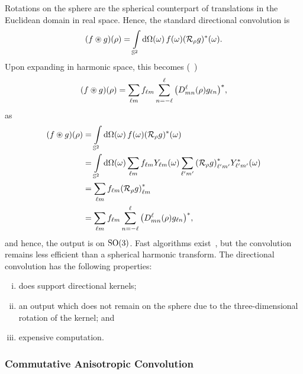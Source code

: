 Rotations on the sphere are the spherical counterpart of translations in the Euclidean domain in real space.
Hence, the standard directional convolution is
%
\begin{equation}\label{eq:chapter3_directional_convolution}
	(f \circledast g)(\rho)
	= \integrateSphere{\omega} \pixel{f} \pixel{\conj{(\rotation{\rho}g)}}.
\end{equation}
%
Upon expanding in harmonic space, this becomes (\eg{}~\cite{McEwen2007,Wandelt2001})
%
\begin{equation}
	(f \circledast g) (\rho)
	= \harmonicSum \harmonic{f} \wignerSum \conj{\big(\wigner{\ell}{m}{n}(\rho) g_{\ell n}\big)},
\end{equation}
%
as
%
\begin{align}
	(f \circledast g)(\rho)
	 & = \integrateSphere{\omega} \pixel{f} \pixel{\conj{(\rotation{\rho}g)}} \nonumber{}                                                                                           \\
	 & = \integrateSphere{\omega} \harmonicSum \harmonic{f} \pixel{\harmonic{Y}} \harmonicSum['] \conj{\harmonic[']{(\rotation{\rho}g)}} \pixel{\conj{\harmonic[']{Y}}} \nonumber{} \\
	 & = \harmonicSum \harmonic{f} \conj{\harmonic{(\rotation{\rho}g)}} \nonumber{}                                                                                                 \\
	 & = \harmonicSum \harmonic{f} \wignerSum \conj{\big(\wigner{\ell}{m}{n}(\rho) g_{\ell n}\big)},
\end{align}
%
and hence, the output is on \(\rotationGroup{}\).
Fast algorithms exist~\cite{McEwen2007,Wandelt2001,Wiaux2007,McEwen2013}, but the convolution remains less efficient than a spherical harmonic transform.
The directional convolution has the following properties:
%
\begin{enumerate}[(i),nosep,left=\parindent]
	\item does support directional kernels;
	\item an output which does not remain on the sphere due to the three-dimensional rotation of the kernel; and
	\item expensive computation.
\end{enumerate}

\subsubsection{Commutative Anisotropic Convolution}


